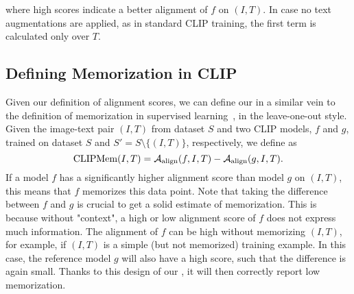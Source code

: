 where high scores indicate a better alignment of $f$ on $(I,T)$. In case no text augmentations are applied, as in standard CLIP training, the first term is calculated only over $T$.


\subsection{Defining Memorization in CLIP}

Given our definition of alignment scores, we can define our \ours in a similar vein to the definition of memorization in supervised learning~\citep{feldman2020does}, in the leave-one-out style. 
Given the image-text pair $(I, T)$ from dataset $S$ and two CLIP models, $f$ and $g$, trained on dataset $S$ and $S' = S \setminus \{(I, T)\}$, respectively, we define \ours as 
\begin{equation}
\text{\ours}(I, T) = \mathcal{A}_{\text{align}}(f, I, T) - \mathcal{A}_{\text{align}}(g, I, T)\text{.}
\end{equation}
If a model $f$ has a significantly higher alignment score than model $g$ on $(I, T)$, this means that $f$ memorizes this data point.
Note that taking the difference between $f$ and $g$ is crucial to get a solid estimate of memorization.
This is because without "context", a high or low alignment score of $f$ does not express much information. 
The alignment of $f$ can be high without memorizing $(I, T)$, for example, if $(I,T)$ is a simple (but not memorized) training example. In this case, the reference model $g$ will also have a high score, such that the difference is again small.
Thanks to this design of our \ours, it will then correctly report low memorization. 

